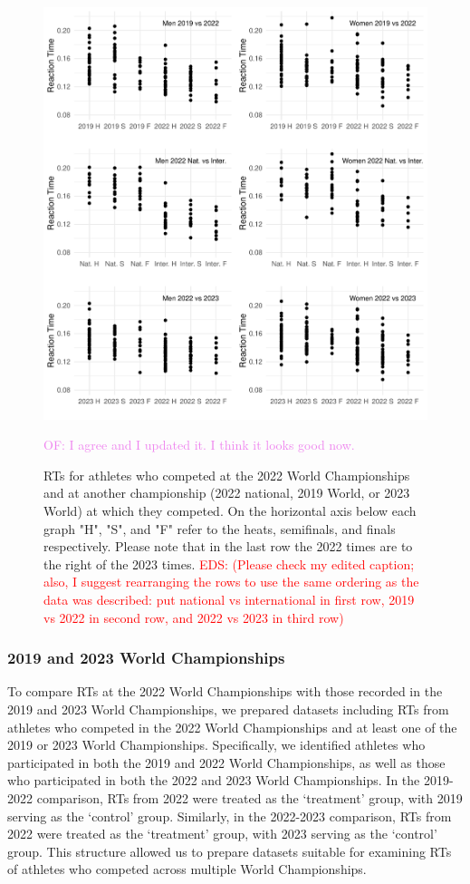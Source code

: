 \documentclass[12pt, letterpaper]{article}
\newcommand{\eds}[1]{\textcolor{red}{EDS: (#1)}}
\newcommand{\of}[1]{\textcolor{violet}{OF: #1}}
\begin{document}
\begin{figure}[tbp]
  \centering
  \includegraphics[width=\textwidth]{RankScatterPlots}
  \caption{RTs for athletes who competed at the 2022 World Championships
	and at another championship (2022 national, 2019 World, or 2023 World) at which
	they competed. On the horizontal
  axis below each graph "H", "S", and "F" refer to the heats, semifinals, and
  finals respectively. Please note that in the last row the 2022 times are to
  the right of the 2023 times.
	\eds{Please check my edited caption; also, I suggest rearranging the rows to
	use the same ordering as the data was described: put national vs international
	in first row, 2019 vs 2022 in second row, and 2022 vs 2023 in third row}
	}
  \of{I agree and I updated it. I think it looks good now.}
  \label{fig:RankScatterplots}
\end{figure}

\subsubsection{2019 and 2023 World Championships}
\label{sec:data2019}

To compare RTs at the 2022 World Championships with those
recorded in the 2019 and 2023 World Championships, we prepared datasets
including RTs from athletes who competed in the 2022 World
Championships and at least one of the 2019 or 2023 World Championships.
Specifically, we identified athletes who participated in both the 2019
and 2022 World Championships, as well as those who participated in both
the 2022 and 2023 World Championships. In the 2019-2022 comparison,
RTs from 2022 were treated as the `treatment' group, with
2019 serving as the `control' group. Similarly, in the 2022-2023
comparison, RTs from 2022 were treated as the `treatment'
group, with 2023 serving as the `control' group. This structure allowed
us to prepare datasets suitable for examining RTs of athletes
who competed across multiple World Championships.
\end{document}
